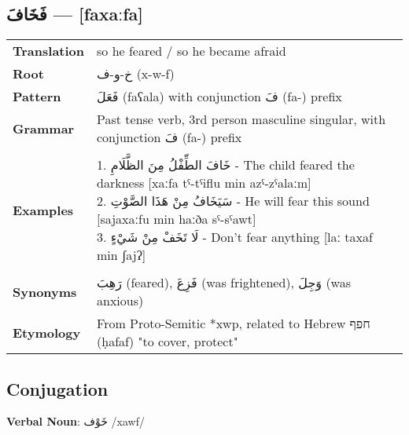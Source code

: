\documentclass[letterpaper,12pt]{article}
\begin{document}
\subsection{\textarabic{فَخَافَ} — [faxaːfa]}
\begin{tabular}{p{3cm}p{10cm}}
\toprule
\textbf{Translation} & so he feared / so he became afraid \\
\textbf{Root} & \textarabic{خ-و-ف} (x-w-f) \\
\textbf{Pattern} & \textarabic{فَعَلَ} (faʕala) with conjunction \textarabic{فَ} (fa-) prefix \\
\textbf{Grammar} & Past tense verb, 3rd person masculine singular, with conjunction \textarabic{فَ} (fa-) prefix \\
\midrule \\
\textbf{Examples} & \makecell[l]{\parbox{9.5cm}{
1. \textarabic{خَافَ الطِّفْلُ مِنَ الظَّلَامِ} - The child feared the darkness [xaːfa tˤ-tˤiflu min azˤ-zˤalaːm]\\
2. \textarabic{سَيَخَافُ مِنْ هَذَا الصَّوْتِ} - He will fear this sound [sajaxaːfu min haːða sˤ-sˤawt]\\
3. \textarabic{لَا تَخَفْ مِنْ شَيْءٍ} - Don't fear anything [laː taxaf min ʃajʔ]
}} \\
\midrule \\
\textbf{Synonyms} & \textarabic{رَهِبَ} (feared), \textarabic{فَزِعَ} (was frightened), \textarabic{وَجِلَ} (was anxious) \\
\textbf{Etymology} & From Proto-Semitic *xwp, related to Hebrew \texthebrew{חפף} (ḥafaf) "to cover, protect" \\
\bottomrule
\end{tabular}

\subsection{Conjugation}
\large \textbf{Verbal Noun}: \textarabic{خَوْف} /xawf/
\end{document}
